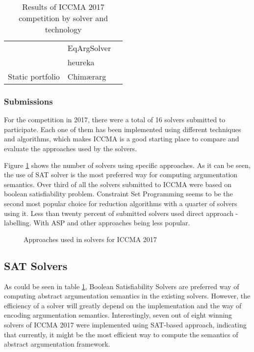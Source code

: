 \begin{table}[]
\begin{tabular}{lll}
		\multicolumn{1}{l|}{}                                         & EqArgSolver                 &                         \\ \cline{2-3} 
		\multicolumn{1}{l|}{}                                         & heureka                     &                         \\ \hline
		\multicolumn{1}{l|}{Static portfolio}                        & Chim\ae rarg &                         \\ \hline
	\end{tabular}
	\caption{Results of ICCMA 2017 competition by solver and technology}
	\label{table:iccmaResultsbySolver}
\end{table}

\subsubsection{Submissions}
For the competition in 2017, there were a total of 16 solvers submitted to participate. Each one of them has been implemented using different techniques and algorithms, which makes ICCMA is a good starting place to compare and evaluate the approaches used by the solvers.

Figure \ref{fig:approachesBarChart} shows the number of solvers using specific approaches. As it can be seen, the use of SAT solver is the most preferred way for computing argumentation semantics. Over third of all the solvers submitted to ICCMA were based on boolean satisfiability problem. Constraint Set Programming seems to be the second most popular choice for reduction algorithms with a quarter of solvers using it. Less than twenty percent of submitted solvers used direct approach - labelling. With ASP and other approaches being less popular.

\begin{figure}
	\centering
	\caption{Approaches used in solvers for ICCMA 2017}
	\label{fig:approachesBarChart}
\end{figure}

\subsection{SAT Solvers}
As could be seen in table \ref{table:iccmaResultsbySolver}, Boolean Satisfiability Solvers are preferred way of computing abstract argumentation semantics in the existing solvers. However, the efficiency of a solver will greatly depend on the implementation and the way of encoding argumentation semantics. Interestingly, seven out of eight winning solvers of ICCMA 2017 were implemented using SAT-based approach, indicating that currently, it might be the most efficient way to compute the semantics of abstract argumentation framework.

